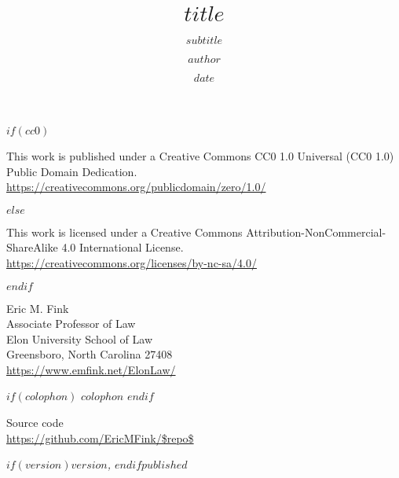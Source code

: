 \documentclass[letterpaper,twoside,openright]{tufte-book}
\title{$title$}
\subtitle{$subtitle$}
\author{$author$}
\date{$date$}
\begin{document}

\frontmatter
\maketitle

\clearpage

\pagestyle{empty}
\begingroup
\parindent 0pt
\vspace*{\fill}




$if(cc0)$

{\ccZero} 

\begin{small}
\raggedright{This work is published under a Creative Commons CC0 1.0 Universal (CC0 1.0) Public Domain Dedication.} \\
\url{https://creativecommons.org/publicdomain/zero/1.0/}
\end{small}
$else$

\href{https://creativecommons.org/licenses/by-nc-sa/4.0/}{\ccbyncsa} 

\begin{small}
\raggedright{This work is licensed under a Creative Commons Attribution-NonCommercial-ShareAlike 4.0 International License.} \\
\url{https://creativecommons.org/licenses/by-nc-sa/4.0/}
\end{small}
$endif$

\vspace{1em}

\begin{small}
Eric M. Fink\\
Associate Professor of Law \\
Elon University School of Law \\
Greensboro, North Carolina 27408 \\
\url{https://www.emfink.net/ElonLaw/}

$if(colophon)$
{$colophon$}
$endif$

\vspace{1em}

Source code \\
\url{https://github.com/EricMFink/$repo$}

\itshape{$if(version)$$version$, $endif$$published$}

\end{small}

\endgroup
\clearpage

\begin{fullwidth}
\setcounter{tocdepth}{3}
\tableofcontents
\end{fullwidth}
\end{document}
